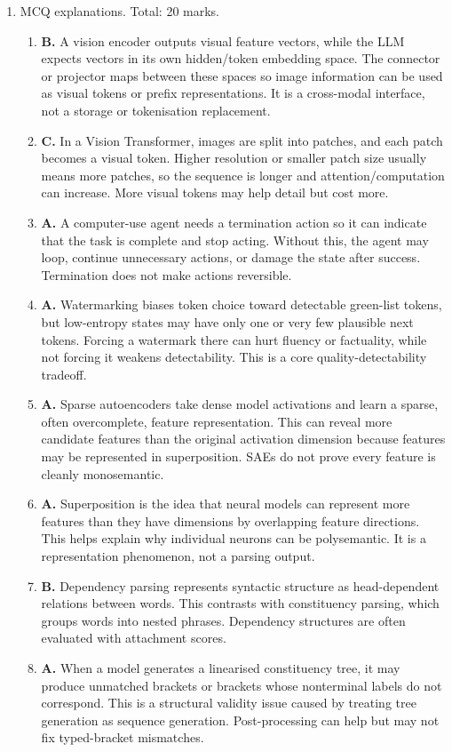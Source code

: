 \documentclass[11pt,a4paper]{article}
\begin{document}
\begin{enumerate}[leftmargin=*]
\item MCQ explanations. Total: 20 marks.
\begin{enumerate}
\item \textbf{B.} A vision encoder outputs visual feature vectors, while the LLM expects vectors in its own hidden/token embedding space. The connector or projector maps between these spaces so image information can be used as visual tokens or prefix representations. It is a cross-modal interface, not a storage or tokenisation replacement.
\item \textbf{C.} In a Vision Transformer, images are split into patches, and each patch becomes a visual token. Higher resolution or smaller patch size usually means more patches, so the sequence is longer and attention/computation can increase. More visual tokens may help detail but cost more.
\item \textbf{A.} A computer-use agent needs a termination action so it can indicate that the task is complete and stop acting. Without this, the agent may loop, continue unnecessary actions, or damage the state after success. Termination does not make actions reversible.
\item \textbf{A.} Watermarking biases token choice toward detectable green-list tokens, but low-entropy states may have only one or very few plausible next tokens. Forcing a watermark there can hurt fluency or factuality, while not forcing it weakens detectability. This is a core quality-detectability tradeoff.
\item \textbf{A.} Sparse autoencoders take dense model activations and learn a sparse, often overcomplete, feature representation. This can reveal more candidate features than the original activation dimension because features may be represented in superposition. SAEs do not prove every feature is cleanly monosemantic.
\item \textbf{A.} Superposition is the idea that neural models can represent more features than they have dimensions by overlapping feature directions. This helps explain why individual neurons can be polysemantic. It is a representation phenomenon, not a parsing output.
\item \textbf{B.} Dependency parsing represents syntactic structure as head-dependent relations between words. This contrasts with constituency parsing, which groups words into nested phrases. Dependency structures are often evaluated with attachment scores.
\item \textbf{A.} When a model generates a linearised constituency tree, it may produce unmatched brackets or brackets whose nonterminal labels do not correspond. This is a structural validity issue caused by treating tree generation as sequence generation. Post-processing can help but may not fix typed-bracket mismatches.

\end{enumerate}
\end{enumerate}
\end{document}
